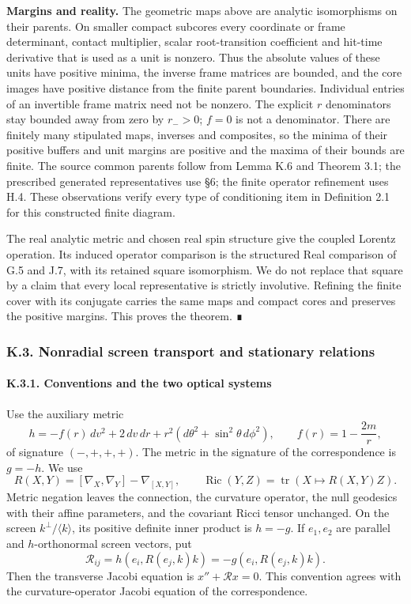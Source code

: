 \documentclass[
  english,
  11pt,
  reqno]{amsart}
\begin{document}
\textbf{Margins and reality.} The geometric maps above are analytic
isomorphisms on their parents. On smaller compact subcores every
coordinate or frame determinant, contact multiplier, scalar
root-transition coefficient and hit-time derivative that is used as a
unit is nonzero. Thus the absolute values of these units have positive
minima, the inverse frame matrices are bounded, and the core images have
positive distance from the finite parent boundaries. Individual entries
of an invertible frame matrix need not be nonzero. The explicit \(r\)
denominators stay bounded away from zero by \(r_->0\); \(f=0\) is not a
denominator. There are finitely many stipulated maps, inverses and
composites, so the minima of their positive buffers and unit margins are
positive and the maxima of their bounds are finite. The source common
parents follow from Lemma K.6 and Theorem 3.1; the prescribed generated
representatives use §6; the finite operator refinement uses H.4. These
observations verify every type of conditioning item in Definition 2.1
for this constructed finite diagram.

The real analytic metric and chosen real spin structure give the coupled
Lorentz operation. Its induced operator comparison is the structured
Real comparison of G.5 and J.7, with its retained square isomorphism. We
do not replace that square by a claim that every local representative is
strictly involutive. Refining the finite cover with its conjugate
carries the same maps and compact cores and preserves the positive
margins. This proves the theorem. ∎

\protect{}\label{sec:sh-integrated-optics}

\subsubsection{K.3. Nonradial screen transport and stationary
relations}\label{k.3.-nonradial-screen-transport-and-stationary-relations}

\protect{}\label{sec:sh-optics-1}

\paragraph{K.3.1. Conventions and the two optical
systems}\label{k.3.1.-conventions-and-the-two-optical-systems}

Use the auxiliary metric \[
 h=-f(r)\,dv^2+2\,dv\,dr+r^2(d\theta^2+\sin^2\theta\,d\phi^2),
 \qquad f(r)=1-\frac{2m}{r},
\] of signature \((-,+,+,+)\). The metric in the signature of the
correspondence is \(g=-h\). We use \[
 R(X,Y)=[\nabla_X,\nabla_Y]-\nabla_{[X,Y]},\qquad
 \operatorname{Ric}(Y,Z)=\operatorname{tr}(X\mapsto R(X,Y)Z).
\] Metric negation leaves the connection, the curvature operator, the
null geodesics with their affine parameters, and the covariant Ricci
tensor unchanged. On the screen \(k^\perp/\langle k\rangle\), its
positive definite inner product is \(h=-g\). If \(e_1,e_2\) are parallel
and \(h\)-orthonormal screen vectors, put \[
 \mathcal R_{ij}=h(e_i,R(e_j,k)k)=-g(e_i,R(e_j,k)k).
\] Then the transverse Jacobi equation is \(x''+\mathcal R x=0\). This
convention agrees with the curvature-operator Jacobi equation of the
correspondence.
\end{document}
